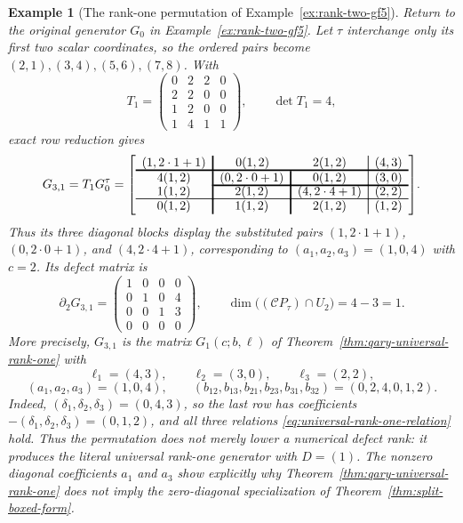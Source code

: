 \documentclass[12pt]{article}
\newtheorem{example}{Example}[section]
\begin{document}
\begin{example}[The rank-one permutation of
Example~\ref{ex:rank-two-gf5}]
\label{ex:rank-one-permutation-gf5}
\rm
Return to the original generator \(G_0\) in
Example~\ref{ex:rank-two-gf5}. Let \(\tau\) interchange only its first two
scalar coordinates, so the ordered pairs become
\((2,1),(3,4),(5,6),(7,8)\). With
\[
T_1=\begin{pmatrix}
0&2&2&0\\
2&2&0&0\\
1&2&0&0\\
1&4&1&1
\end{pmatrix},\qquad \det T_1=4,
\]
exact row reduction gives
\[
G_{3,1}=T_1G_0^\tau=
{\arrayrulewidth=1.2pt
\left[\begin{array}{c!{\vrule width 1.2pt}c!{\vrule width 1.2pt}c!{\vrule width 0.6pt}c}
(1,2\cdot1+1)&\multicolumn{1}{c}{0(1,2)}&2(1,2)&(4,3)\\[-1pt]
\noalign{\hrule height 1.2pt}
4(1,2)&(0,2\cdot0+1)&0(1,2)&(3,0)\\[-1pt]
\cline{2-4}
1(1,2)&2(1,2)&(4,2\cdot4+1)&(2,2)\\[-1pt]
\noalign{\hrule height 0.6pt}
0(1,2)&1(1,2)&2(1,2)&(1,2)
\end{array}\right]}.
\]
Thus its three diagonal blocks display the substituted pairs
\((1,2\cdot1+1)\), \((0,2\cdot0+1)\), and
\((4,2\cdot4+1)\), corresponding to
\((a_1,a_2,a_3)=(1,0,4)\) with \(c=2\). Its defect matrix is
\[
\partial_2G_{3,1}=
\begin{pmatrix}
1&0&0&0\\
0&1&0&4\\
0&0&1&3\\
0&0&0&0
\end{pmatrix},
\qquad
\dim\bigl((\mathcal C P_\tau)\cap U_2\bigr)=4-3=1.
\]
More precisely, \(G_{3,1}\) is the matrix \(G_1(c;b,\ell)\) of
Theorem~\ref{thm:qary-universal-rank-one} with
\[
\ell_1=(4,3),\qquad \ell_2=(3,0),\qquad \ell_3=(2,2),
\]
\[
(a_1,a_2,a_3)=(1,0,4),\qquad
(b_{12},b_{13},b_{21},b_{23},b_{31},b_{32})=(0,2,4,0,1,2).
\]
Indeed, \((\delta_1,\delta_2,\delta_3)=(0,4,3)\), so the last row has
coefficients \(-(\delta_1,\delta_2,\delta_3)=(0,1,2)\), and all three
relations \eqref{eq:universal-rank-one-relation} hold. Thus the permutation
does not merely lower a numerical defect rank: it produces the literal
universal rank-one generator with \(D=(1)\). The nonzero diagonal
coefficients \(a_1\) and \(a_3\) show explicitly why
Theorem~\ref{thm:qary-universal-rank-one} does not imply the zero-diagonal
specialization of Theorem~\ref{thm:split-boxed-form}.
\end{example}
\end{document}
